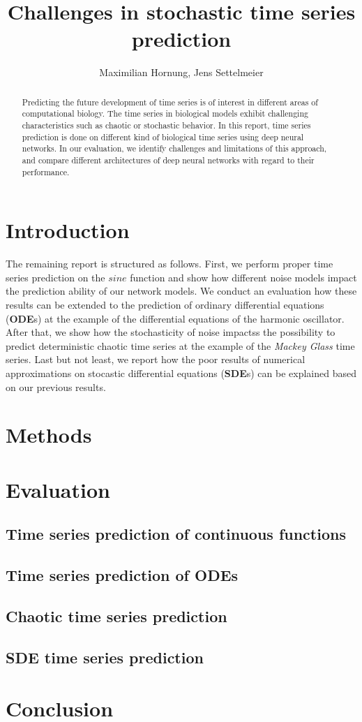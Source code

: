 \documentclass{article}
\title{Challenges in stochastic time series prediction}
\author{Maximilian Hornung, Jens Settelmeier}
\begin{document}
\maketitle

\begin{abstract}
    Predicting the future development of time series is of interest in different
    areas of computational biology. The time series in biological models exhibit
    challenging characteristics such as chaotic or stochastic behavior. In this
    report, time series prediction is done on different kind of biological time
    series using deep neural networks. In our evaluation, we identify challenges
    and limitations of this approach, and compare different architectures of
    deep neural networks with regard to their performance.
\end{abstract}

\section{Introduction}

The remaining report is structured as follows. First, we perform proper time 
series prediction on the $sine$ function and show how different noise models
impact the prediction ability of our network models. We conduct an evaluation
how these results can be extended to the prediction of 
ordinary differential equations (\textbf{ODE}s) at the example of the 
differential equations of the harmonic oscillator. After that, we show how the
stochasticity of noise impactss the possibility to predict deterministic
chaotic time series at the example of the \emph{Mackey Glass} time series. Last
but not least, we report how the poor results of numerical approximations on 
stocastic differential equations (\textbf{SDE}s) can be explained based on our
previous results.

\section{Methods}

\section{Evaluation}
\subsection{Time series prediction of continuous functions}

\subsection{Time series prediction of ODEs}

\subsection{Chaotic time series prediction}

\subsection{SDE time series prediction}
    
\section{Conclusion}
\end{document}
